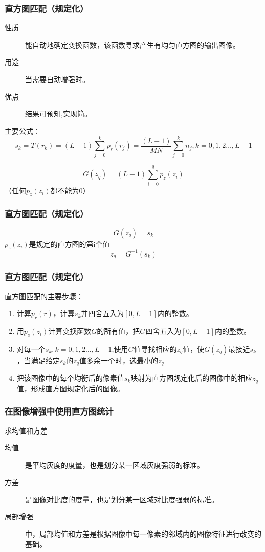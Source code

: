 \documentclass[notheorems,serif,table,compress]{beamer}  %
\begin{document}
 \begin{frame}
\frametitle{直方图匹配（规定化）}
    
\begin{description}
 \item [性质]能自动地确定变换函数，该函数寻求产生有均匀直方图的输出图像。
 \item [用途]当需要自动增强时。
 \item [优点]结果可预知,实现简。
 \end{description}

主要公式：
 \begin{equation} \label {3.13}
s_{k}=T(r_{k})=(L-1)\sum_{j=0}^{k}p_{r}(r_{j})=\frac{(L-1)}{MN}\sum_{j=0}^{k}{n_{j}},k=0,1,2\ldots,L-1
\end{equation}
 
  \begin{equation} \label {3.14}
G(z_{q})=(L-1)\sum_{i=0}^{q}p_{z}(z_{i})
\end{equation}
（任何$p_{z}(z_{i})$都不能为0）
\end{frame}
\begin{frame}
\frametitle{直方图匹配（规定化）}
\begin{equation} \label {3.15}
G(z_{q})=s_{k}
\end{equation}
$p_z(z_{i})$是规定的直方图的第i个值
\begin{equation} \label {3.16}
z_{q}=G^{-1}(s_{k})
\end{equation}
\end{frame}

\begin{frame}
\frametitle{直方图匹配（规定化）}
  直方图匹配的主要步骤：
  \begin{enumerate}
  \item 计算$p_{r}(r)$，计算$s_{k}$并四舍五入为$[0,L-1]$内的整数。
  \item 用$p_{z}(z_{i})$计算变换函数$G$的所有值，把$G$四舍五入为$[0,L-1]$内的整数。
  \item 对每一个$s_{k},k=0,1,2\ldots,L-1$,使用$G$值寻找相应的$z_{q}$值，使$G(z_{q})$最接近$s_{k}$，当满足给定$s_{k}$的$z_{q}$值多余一个时，选最小的$z_{q}$
  \item 把该图像中的每个均衡后的像素值$s_{k}$映射为直方图规定化后的图像中的相应$z_{q}$值，形成直方图规定化后的图像。
   \end{enumerate} 

 \end{frame}
\begin{frame}
\frametitle{在图像增强中使用直方图统计}
 
 求均值和方差
 \begin{description}
 \item [均值]是平均灰度的度量，也是划分某一区域灰度强弱的标准。
 \item [方差]是图像对比度的度量，也是划分某一区域对比度强弱的标准。
 \item [局部增强]中，局部均值和方差是根据图像中每一像素的邻域内的图像特征进行改变的基础。
 \end{description}
 
 \end{frame}
\end{document}
